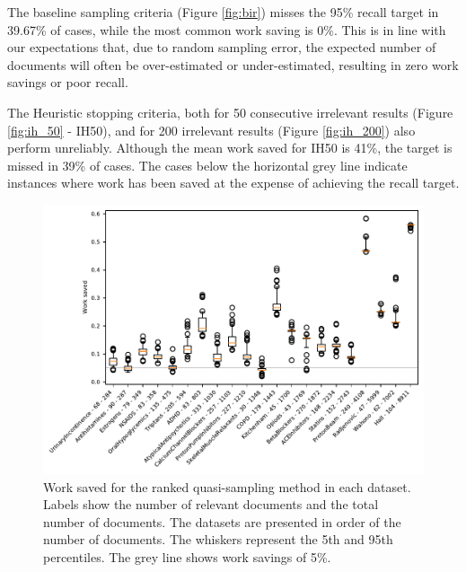 \documentclass{bmcart}
\begin{document}
	
	
	The baseline sampling criteria (Figure \ref{fig:bir}) misses the 95\% recall target in 39.67\% of cases, while the most common work saving is 0\%. This is in line with our expectations that, due to random sampling error, the expected number of documents will often be over-estimated or under-estimated, resulting in zero work savings or poor recall.
	
	The Heuristic stopping criteria, both for 50 consecutive irrelevant results (Figure \ref{fig:ih_50} - IH50), and for 200 irrelevant results (Figure \ref{fig:ih_200}) also perform unreliably. Although the mean work saved for IH50 is 41\%, the target is missed in 39\% of cases. The cases below the horizontal grey line indicate instances where work has been saved at the expense of achieving the recall target.
	
	\begin{figure}
		\includegraphics[width=0.9\linewidth]{2_figs_wss_nrs.pdf}
		\caption{Work saved for the ranked quasi-sampling method in each dataset. Labels show the number of relevant documents and the total number of documents. The datasets are presented in order of the number of documents. The whiskers represent the 5th and 95th percentiles. The grey line shows work savings of 5\%. }
		\label{wss}
	\end{figure}
	
\end{document}
